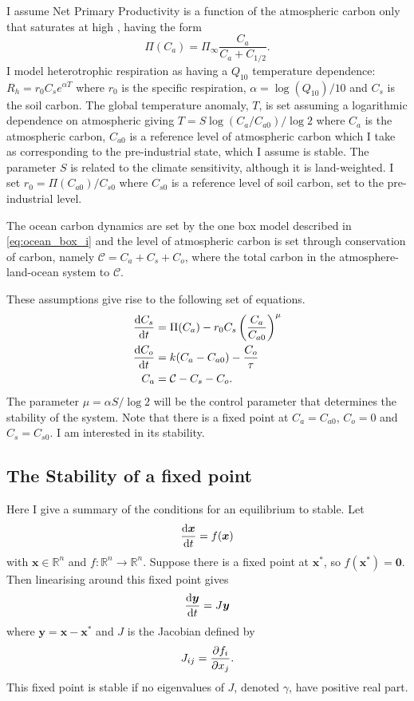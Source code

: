 I assume Net Primary Productivity is a function of the atmospheric carbon only that saturates at high , having the form
\begin{equation}
  \label{eq:npp}
  \Pi(C_a) = \Pi_{\infty}\frac{C_a}{C_a + C_{1/2}}.
\end{equation}
I model heterotrophic respiration as having a $Q_{10}$ temperature dependence:
$R_h = r_0 C_s e^{\alpha T}$ where $r_0$ is the specific respiration, $\alpha = \log \left( Q_{10} \right)/10$ and $C_s$ is the soil carbon. The global temperature anomaly, $T$,
is set assuming a logarithmic dependence on atmospheric  giving $T = S \log \left(C_a / C_{a0}\right)/\log 2$ where $C_a$ is the atmospheric carbon, $C_{a0}$ is a reference level of
atmospheric carbon which I take as corresponding to the pre-industrial state, which I assume is stable. The parameter $S$ is related to the climate sensitivity, although it is land-weighted.
I set $r_0 = \Pi(C_{a0})/C_{s0}$ where $C_{s0}$ is a reference level of soil carbon, set to the pre-industrial level.  

The ocean carbon dynamics are set by the one box model described in \cref{eq:ocean_box_i} and the level of atmospheric carbon is set through conservation of carbon, namely $\mathcal{C} = C_a + C_s + C_o$,
where the total carbon in the atmosphere-land-ocean system to $\mathcal{C}$.

These assumptions give rise to the following set of equations.
\begin{subequations}
  \label{eq:one_box_ocean}
  \begin{align}
    \dv{C_s}{t} &= \Pi(C_a) - r_0 C_s \left(\frac{C_a}{C_{a0}}\right)^{\mu} \\
    \dv{C_o}{t} &= k(C_a - C_{a0}) - \frac{C_o}{\tau} \\
    C_a &= \mathcal{C} - C_s - C_o.
\end{align}
\end{subequations}
The parameter $\mu = \alpha S / \log 2$ will be the control parameter that determines the stability of the system.
Note that there is a fixed point at $C_a = C_{a0}$, $C_o = 0$ and $C_s = C_{s0}$. I am interested in its stability.
\subsection{The Stability of a fixed point}
Here I give a summary of the conditions for an equilibrium to stable. Let
\begin{equation}
  \label{eq:generic_system}
  \dv{\bm{x}}{t} = f(\bm{x})
\end{equation}
with $\bm{x} \in \mathbb{R}^n$ and $f: \mathbb{R}^n \rightarrow \mathbb{R}^n$. Suppose there is a fixed point at $\bm{x}^*$, so $f(\bm{x}^*) = \bm{0}$. Then linearising around this
fixed point gives
\begin{equation}
  \label{eq:generic_system_linearised}
  \dv{\bm{y}}{t} = J\bm{y}
\end{equation}
where $\bm{y} = \bm{x} - \bm{x}^*$ and $J$ is the Jacobian defined by
\begin{equation}
  \label{eq:generic_jacobian}
  J_{ij} = \pdv{f_i}{x_j}.
\end{equation}
This fixed point is stable if no eigenvalues of $J$, denoted $\gamma$, have positive real part.
